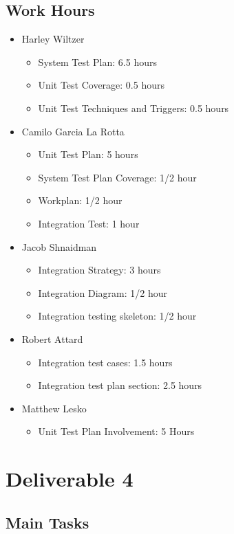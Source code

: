 \documentclass[12pt]{article}
\begin{document}
 \subsection{Work Hours}
%
 \begin{itemize}
     \item Harley Wiltzer
 		\begin{itemize}
 			\item System Test Plan: 6.5 hours
			\item Unit Test Coverage: 0.5 hours
			\item Unit Test Techniques and Triggers: 0.5 hours
 		\end{itemize}
     \item Camilo Garcia La Rotta
 		\begin{itemize}
 			\item Unit Test Plan: 5 hours
 			\item System Test Plan Coverage: 1/2 hour
 			\item Workplan: 1/2 hour
 			\item Integration Test: 1 hour
 		\end{itemize}
     \item Jacob Shnaidman
     \begin{itemize}
         \item Integration Strategy: 3 hours
	 \item Integration Diagram: 1/2 hour
	 \item Integration testing skeleton: 1/2 hour
     \end{itemize}
     \item Robert Attard
     \begin{itemize}
     	\item Integration test cases: 1.5 hours
        \item Integration test plan section: 2.5 hours
     \end{itemize}
     \item Matthew Lesko
     \begin{itemize}
     	\item Unit Test Plan Involvement: 5 Hours
     \end{itemize}
 \end{itemize}

 \section{Deliverable 4}

 \subsection{Main Tasks}
\end{document}
